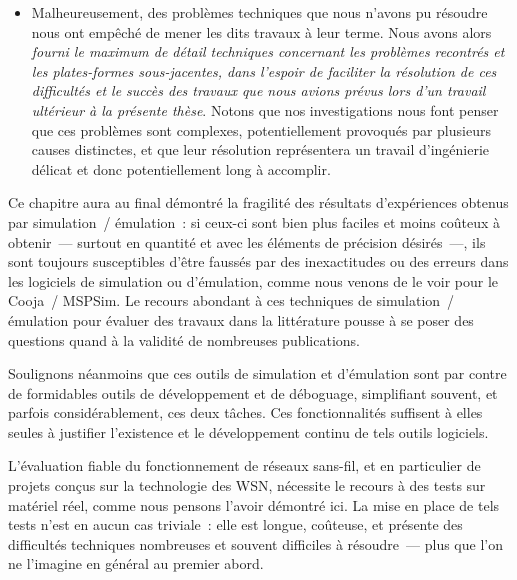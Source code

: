 \begin{itemize}
\medskip

\item Malheureusement, des problèmes techniques que nous n'avons pu résoudre
nous ont empêché de mener les dits travaux à leur terme. Nous avons alors
\emph{fourni le maximum de détail techniques concernant les problèmes
recontrés et les plates-formes sous-jacentes, dans l'espoir de faciliter
la résolution de ces difficultés et le succès des travaux que nous avions
prévus lors d'un travail ultérieur à la présente thèse}. Notons que nos
investigations nous font penser que ces problèmes sont complexes,
potentiellement provoqués par plusieurs causes distinctes, et que
leur résolution représentera un travail d'ingénierie délicat et donc
potentiellement long à accomplir.

\end{itemize}

\bigskip

Ce chapitre aura au final démontré la fragilité des résultats d'expériences
obtenus par simulation~/ émulation~: si ceux-ci sont bien plus faciles et
moins coûteux à obtenir~--- surtout en quantité et avec les éléments de
précision désirés~---, ils sont toujours susceptibles d'être faussés par
des inexactitudes ou des erreurs dans les logiciels de simulation ou
d'émulation, comme nous venons de le voir pour le  Cooja~/
MSPSim. Le recours abondant à ces techniques de simulation~/ émulation
pour évaluer des travaux dans la littérature pousse à se poser des questions
quand à la validité de nombreuses publications.

Soulignons néanmoins que ces outils de simulation et d'émulation sont par
contre de formidables outils de développement et de déboguage, simplifiant
souvent, et parfois considérablement, ces deux tâches. Ces fonctionnalités
suffisent à elles seules à justifier l'existence et le développement continu
de tels outils logiciels.

\medskip

L'évaluation fiable du fonctionnement de réseaux sans-fil, et en particulier
de projets conçus sur la technologie des WSN, nécessite 
le recours à des tests sur matériel réel, comme nous pensons l'avoir
démontré ici. La mise en place de tels tests n'est en aucun cas triviale~:
elle est longue, coûteuse, et présente des difficultés techniques nombreuses
et souvent difficiles à résoudre~--- plus que l'on ne l'imagine en général
au premier abord.

